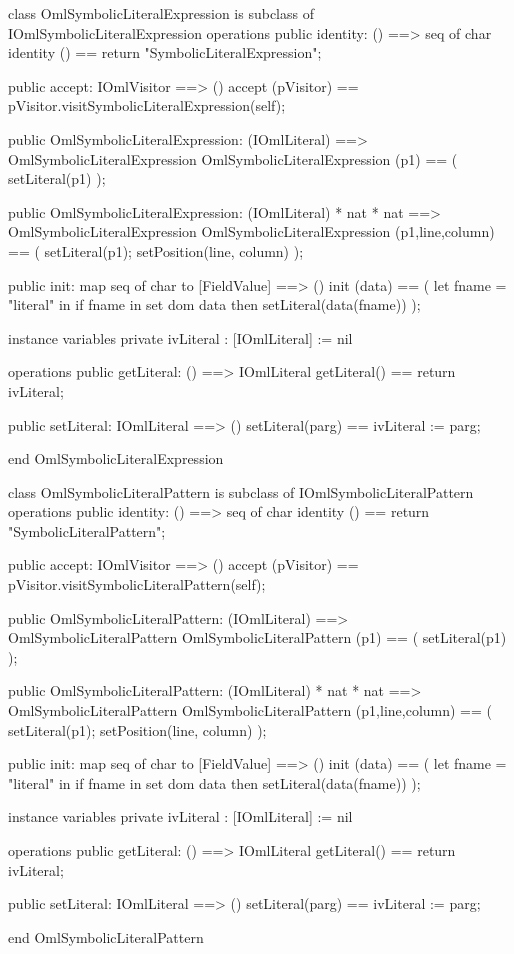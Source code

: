 \begin{vdm_al}
class OmlSymbolicLiteralExpression is subclass of IOmlSymbolicLiteralExpression
operations
  public identity: () ==> seq of char
  identity () == return "SymbolicLiteralExpression";

  public accept: IOmlVisitor ==> ()
  accept (pVisitor) == pVisitor.visitSymbolicLiteralExpression(self);

  public OmlSymbolicLiteralExpression:
    (IOmlLiteral) ==> OmlSymbolicLiteralExpression
  OmlSymbolicLiteralExpression (p1) == 
    ( setLiteral(p1) );

  public OmlSymbolicLiteralExpression:
    (IOmlLiteral) *
    nat *
    nat ==> OmlSymbolicLiteralExpression
  OmlSymbolicLiteralExpression (p1,line,column) == 
    ( setLiteral(p1);
      setPosition(line, column) );

  public init: map seq of char to [FieldValue] ==> ()
  init (data) ==
    ( let fname = "literal" in
        if fname in set dom data
        then setLiteral(data(fname)) );

instance variables
  private ivLiteral : [IOmlLiteral] := nil

operations
  public getLiteral: () ==> IOmlLiteral
  getLiteral() == return ivLiteral;

  public setLiteral: IOmlLiteral ==> ()
  setLiteral(parg) == ivLiteral := parg;

end OmlSymbolicLiteralExpression
\end{vdm_al}

\begin{vdm_al}
class OmlSymbolicLiteralPattern is subclass of IOmlSymbolicLiteralPattern
operations
  public identity: () ==> seq of char
  identity () == return "SymbolicLiteralPattern";

  public accept: IOmlVisitor ==> ()
  accept (pVisitor) == pVisitor.visitSymbolicLiteralPattern(self);

  public OmlSymbolicLiteralPattern:
    (IOmlLiteral) ==> OmlSymbolicLiteralPattern
  OmlSymbolicLiteralPattern (p1) == 
    ( setLiteral(p1) );

  public OmlSymbolicLiteralPattern:
    (IOmlLiteral) *
    nat *
    nat ==> OmlSymbolicLiteralPattern
  OmlSymbolicLiteralPattern (p1,line,column) == 
    ( setLiteral(p1);
      setPosition(line, column) );

  public init: map seq of char to [FieldValue] ==> ()
  init (data) ==
    ( let fname = "literal" in
        if fname in set dom data
        then setLiteral(data(fname)) );

instance variables
  private ivLiteral : [IOmlLiteral] := nil

operations
  public getLiteral: () ==> IOmlLiteral
  getLiteral() == return ivLiteral;

  public setLiteral: IOmlLiteral ==> ()
  setLiteral(parg) == ivLiteral := parg;

end OmlSymbolicLiteralPattern
\end{vdm_al}

